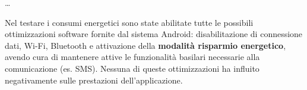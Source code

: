 \ldots

Nel testare i consumi energetici sono state abilitate tutte le possibili ottimizzazioni software fornite dal sistema Android:
disabilitazione di connessione dati, Wi-Fi, Bluetooth e attivazione della \textbf{modalità risparmio energetico}, avendo cura di
mantenere attive le funzionalità basilari necessarie alla comunicazione (es. SMS). Nessuna di queste ottimizzazioni ha 
influito negativamente sulle prestazioni dell'applicazione.